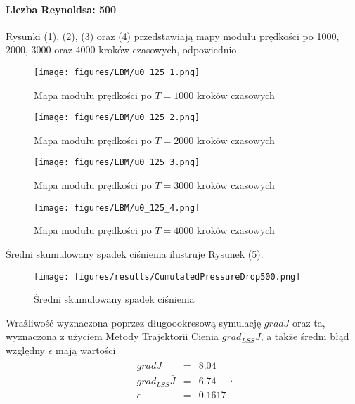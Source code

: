 \documentclass[12pt]{article}
\begin{document}
\paragraph{Liczba Reynoldsa: 500}
Rysunki (\ref{Fig46}), (\ref{Fig47}), (\ref{Fig48}) oraz (\ref{Fig49}) przedstawiają mapy modułu prędkości po 1000, 2000, 3000 oraz 4000 kroków czasowych, odpowiednio 
\begin{figure}[H]
	\texttt{[image: figures/LBM/u0\_125\_1.png]} 
	\caption{Mapa modułu prędkości po $ T=1000 $ kroków czasowych}
	\label{Fig46}
\end{figure}
\begin{figure}[H]
	\texttt{[image: figures/LBM/u0\_125\_2.png]} 
	\caption{Mapa modułu prędkości po $ T=2000 $ kroków czasowych}
	\label{Fig47}
\end{figure}
\begin{figure}[H]
	\texttt{[image: figures/LBM/u0\_125\_3.png]} 
	\caption{Mapa modułu prędkości po $ T=3000 $ kroków czasowych}
	\label{Fig48}
\end{figure}
\begin{figure}[H]
	\texttt{[image: figures/LBM/u0\_125\_4.png]} 
	\caption{Mapa modułu prędkości po $ T=4000 $ kroków czasowych}
	\label{Fig49}
\end{figure}
Średni skumulowany spadek ciśnienia ilustruje Rysunek (\ref{Fig50}).
\begin{figure}[H]
	\texttt{[image: figures/results/CumulatedPressureDrop500.png]} 
	\centering
	\caption{Średni skumulowany spadek ciśnienia}
	\label{Fig50}
\end{figure}
Wrażliwość wyznaczona poprzez długoookresową symulację $ grad\bar{J} $ oraz ta, wyznaczona z użyciem Metody Trajektorii Cienia $ grad_{LSS}\bar{J} $, a także średni błąd względny $ \epsilon $ mają wartości
\begin{equation}
\begin{array}{rcl}
grad\bar{J} &=& 8.04 \\
grad_{LSS}\bar{J} &=& 6.74 \\
\epsilon &=& 0.1617 
\end{array}.
\label{results500}
\end{equation} 
\end{document}
